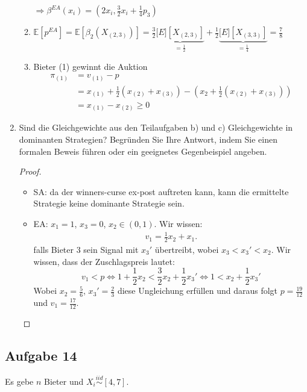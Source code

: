 \documentclass[12pt]{extreport} %
\theoremstyle{named}
\theoremstyle{nnamed}
\theoremstyle{itshape}
\theoremstyle{normal}
\begin{document}
\begin{enumerate}
\begin{enumerate}
	 			$\Rightarrow \beta^{EA}(x_{i}) = \left( 2 x_{i}, \frac{3}{2} x_{i} + \frac{1}{4} p_{3} \right)$
	 		\item $\mathds{E}\left[ p^{EA} \right] = \mathds{E}\left[ \beta_{2} \left( X_{(2,3)} \right) \right] = \frac{3}{2} \underbrace{\mathds[E] \left[ X_{(2,3)} \right]}_{= \frac{1}{2}} + \frac{1}{2} \underbrace{\mathds[E] \left[ X_{(3,3)} \right]}_{= \frac{1}{4}} = \frac{7}{8}$
	 		\item Bieter (1) gewinnt die Auktion
	 			\begin{align*}
	 				\pi_{(1)} & = v_{(1)} - p \\
	 						& = x_{(1)} + \frac{1}{2} \left( x_{(2)} + x_{(3)} \right) - \left( x_{2} + \frac{1}{2} \left( x_{(2)} + x_{(3)} \right) \right) \\
	 						& = x_{(1)} - x_{(2)} \geq 0
	 			\end{align*} 
		  \end{enumerate}
	\item Sind die Gleichgewichte aus den Teilaufgaben b) und c) Gleichgewichte in dominanten Strategien? Begründen Sie Ihre Antwort, indem Sie einen formalen Beweis führen oder ein geeignetes Gegenbeispiel angeben.
		\begin{proof}
			\begin{itemize}
				\item SA: da der winners-curse ex-post auftreten kann, kann die ermittelte Strategie keine dominante Strategie sein.
				\item EA: $x_1 = 1$, $x_3 = 0$, $x_2 \in (0, 1)$. Wir wissen:
					\begin{align*}
						v_1 = \frac{1}{2} x_2 + x_1.
					\end{align*}
					falls Bieter 3 sein Signal mit $x_3'$ übertreibt, wobei $x_3 < x_3' < x_2$. Wir wissen, dass der Zuschlagspreis lautet:
					$$ v_1 < p \iff 1 + \frac{1}{2} x_2 < \frac{3}{2} x_2 + \frac{1}{2} x_3' \iff 1 < x_2 + \frac{1}{2} x_3' $$
					Wobei $x_2  = \frac{5}{6}$, $x_3' = \frac{2}{3}$ diese Ungleichung erfüllen und daraus folgt $p = \frac{19}{12}$ und $v_1 = \frac{17}{12}$.
			\end{itemize}
		\end{proof}
\end{enumerate}

\subsection*{Aufgabe 14}

Es gebe $n$ Bieter und $X_{i} \overset{iid}{\sim} [4, 7]$.
\end{document}

